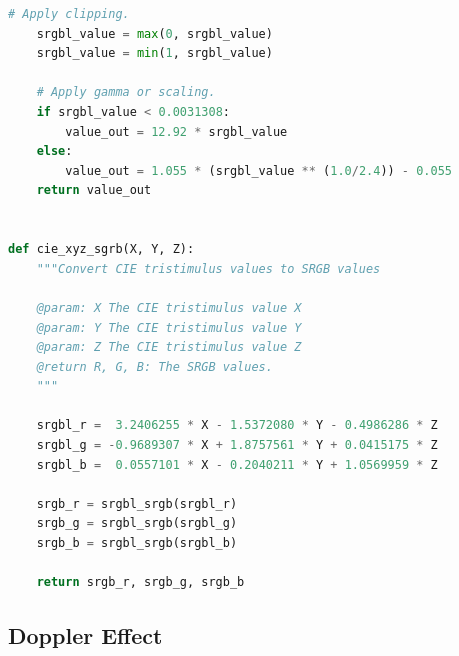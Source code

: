 \documentclass [12pt, a4paper] {article}
\begin{document}
\begin{lstlisting}[language=python, caption={Implementation of the integration of XYZ tristimulus 
    values and conversion to SRGB.}]
    # Apply clipping.
    srgbl_value = max(0, srgbl_value)
    srgbl_value = min(1, srgbl_value)

    # Apply gamma or scaling.
    if srgbl_value < 0.0031308:
        value_out = 12.92 * srgbl_value 
    else: 
        value_out = 1.055 * (srgbl_value ** (1.0/2.4)) - 0.055
    return value_out


def cie_xyz_sgrb(X, Y, Z):
    """Convert CIE tristimulus values to SRGB values
    
    @param: X The CIE tristimulus value X
    @param: Y The CIE tristimulus value Y
    @param: Z The CIE tristimulus value Z
    @return R, G, B: The SRGB values.
    """

    srgbl_r =  3.2406255 * X - 1.5372080 * Y - 0.4986286 * Z
    srgbl_g = -0.9689307 * X + 1.8757561 * Y + 0.0415175 * Z
    srgbl_b =  0.0557101 * X - 0.2040211 * Y + 1.0569959 * Z

    srgb_r = srgbl_srgb(srgbl_r)
    srgb_g = srgbl_srgb(srgbl_g)
    srgb_b = srgbl_srgb(srgbl_b)

    return srgb_r, srgb_g, srgb_b
\end{lstlisting}



\subsection{Doppler Effect}
\end{document}
